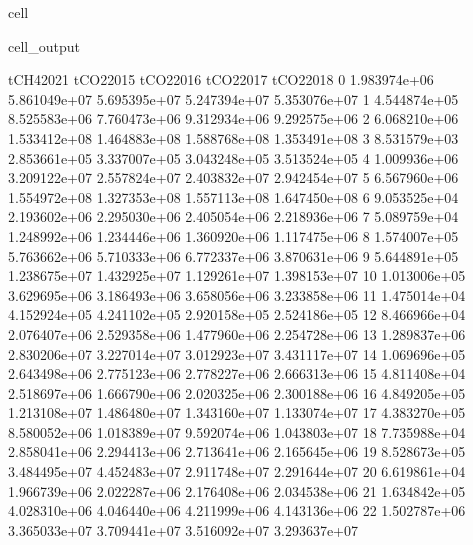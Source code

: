 \documentclass[letterpaper,10pt,english]{jupyterBook}
\begin{document}
\begin{sphinxuseclass}{cell}
\begin{sphinxVerbatimOutput}
\begin{sphinxuseclass}{cell_output}
\begin{sphinxVerbatim}[commandchars=\\\{\}]
       tCH4\PYGZus{}2021     tCO2\PYGZus{}2015     tCO2\PYGZus{}2016     tCO2\PYGZus{}2017     tCO2\PYGZus{}2018  \PYGZbs{}
0   1.983974e+06  5.861049e+07  5.695395e+07  5.247394e+07  5.353076e+07   
1   4.544874e+05  8.525583e+06  7.760473e+06  9.312934e+06  9.292575e+06   
2   6.068210e+06  1.533412e+08  1.464883e+08  1.588768e+08  1.353491e+08   
3   8.531579e+03  2.853661e+05  3.337007e+05  3.043248e+05  3.513524e+05   
4   1.009936e+06  3.209122e+07  2.557824e+07  2.403832e+07  2.942454e+07   
5   6.567960e+06  1.554972e+08  1.327353e+08  1.557113e+08  1.647450e+08   
6   9.053525e+04  2.193602e+06  2.295030e+06  2.405054e+06  2.218936e+06   
7   5.089759e+04  1.248992e+06  1.234446e+06  1.360920e+06  1.117475e+06   
8   1.574007e+05  5.763662e+06  5.710333e+06  6.772337e+06  3.870631e+06   
9   5.644891e+05  1.238675e+07  1.432925e+07  1.129261e+07  1.398153e+07   
10  1.013006e+05  3.629695e+06  3.186493e+06  3.658056e+06  3.233858e+06   
11  1.475014e+04  4.152924e+05  4.241102e+05  2.920158e+05  2.524186e+05   
12  8.466966e+04  2.076407e+06  2.529358e+06  1.477960e+06  2.254728e+06   
13  1.289837e+06  2.830206e+07  3.227014e+07  3.012923e+07  3.431117e+07   
14  1.069696e+05  2.643498e+06  2.775123e+06  2.778227e+06  2.666313e+06   
15  4.811408e+04  2.518697e+06  1.666790e+06  2.020325e+06  2.300188e+06   
16  4.849205e+05  1.213108e+07  1.486480e+07  1.343160e+07  1.133074e+07   
17  4.383270e+05  8.580052e+06  1.018389e+07  9.592074e+06  1.043803e+07   
18  7.735988e+04  2.858041e+06  2.294413e+06  2.713641e+06  2.165645e+06   
19  8.528673e+05  3.484495e+07  4.452483e+07  2.911748e+07  2.291644e+07   
20  6.619861e+04  1.966739e+06  2.022287e+06  2.176408e+06  2.034538e+06   
21  1.634842e+05  4.028310e+06  4.046440e+06  4.211999e+06  4.143136e+06   
22  1.502787e+06  3.365033e+07  3.709441e+07  3.516092e+07  3.293637e+07   


\end{sphinxVerbatim}
\end{sphinxuseclass}
\end{sphinxVerbatimOutput}
\end{sphinxuseclass}
\end{document}
